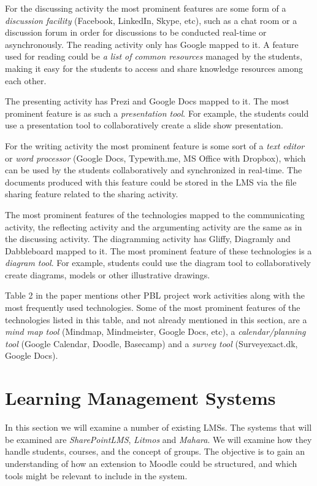 For the discussing activity the most prominent features are some form of a \textit{discussion facility} (Facebook, LinkedIn, Skype, etc), such as a chat room or a discussion forum in order for discussions to be conducted real-time or asynchronously.
The reading activity only has Google mapped to it.
A feature used for reading could be \textit{a list of common resources} managed by the students, making it easy for the students to access and share knowledge resources among each other.

The presenting activity has Prezi and Google Docs mapped to it. The most prominent feature is as such a \textit{presentation tool}.
For example, the students could use a presentation tool to collaboratively create a slide show presentation.

For the writing activity the most prominent feature is some sort of a \textit{text editor} or \textit{word processor} (Google Docs, Typewith.me, MS Office with Dropbox), which can be used by the students collaboratively and synchronized in real-time.
The documents produced with this feature could be stored in the LMS via the file sharing feature related to the sharing activity.

The most prominent features of the technologies mapped to the communicating activity, the reflecting activity and the argumenting activity are the same as in the discussing activity.
The diagramming activity has Gliffy, Diagramly and Dabbleboard mapped to it.
The most prominent feature of these technologies is a \textit{diagram tool}.
For example, students could use the diagram tool to collaboratively create diagrams, models or other illustrative drawings.

Table 2 in the paper mentions other PBL project work activities along with the most frequently used technologies.
Some of the most prominent features of the technologies listed in this table, and not already mentioned in this section, are a \textit{mind map tool} (Mindmap, Mindmeister, Google Docs, etc), a \textit{calendar/planning tool} (Google Calendar, Doodle, Basecamp) and a \textit{survey tool} (Surveyexact.dk, Google Docs).

\section{Learning Management Systems}\label{sec:LMS}
In this section we will examine a number of existing LMSs.
The systems that will be examined are \emph{SharePointLMS}, \emph{Litmos} and \emph{Mahara}.
We will examine how they handle students, courses, and the concept of groups.
The objective is to gain an understanding of how an extension to Moodle could be structured, and which tools might be relevant to include in the system.

